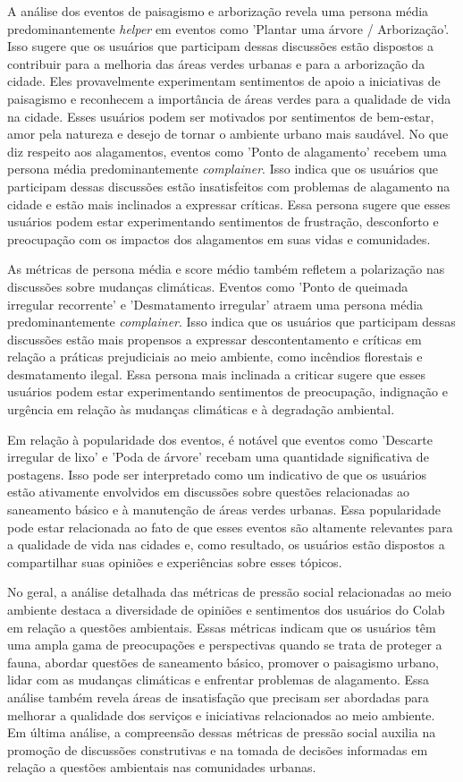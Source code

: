 A análise dos eventos de paisagismo e arborização revela uma persona média predominantemente \textit{helper} em eventos como 'Plantar uma árvore / Arborização'. Isso sugere que os usuários que participam dessas discussões estão dispostos a contribuir para a melhoria das áreas verdes urbanas e para a arborização da cidade. Eles provavelmente experimentam sentimentos de apoio a iniciativas de paisagismo e reconhecem a importância de áreas verdes para a qualidade de vida na cidade. Esses usuários podem ser motivados por sentimentos de bem-estar, amor pela natureza e desejo de tornar o ambiente urbano mais saudável. No que diz respeito aos alagamentos, eventos como 'Ponto de alagamento' recebem uma persona média predominantemente \textit{complainer}. Isso indica que os usuários que participam dessas discussões estão insatisfeitos com problemas de alagamento na cidade e estão mais inclinados a expressar críticas. Essa persona sugere que esses usuários podem estar experimentando sentimentos de frustração, desconforto e preocupação com os impactos dos alagamentos em suas vidas e comunidades.

As métricas de persona média e score médio também refletem a polarização nas discussões sobre mudanças climáticas. Eventos como 'Ponto de queimada irregular recorrente' e 'Desmatamento irregular' atraem uma persona média predominantemente \textit{complainer}. Isso indica que os usuários que participam dessas discussões estão mais propensos a expressar descontentamento e críticas em relação a práticas prejudiciais ao meio ambiente, como incêndios florestais e desmatamento ilegal. Essa persona mais inclinada a criticar sugere que esses usuários podem estar experimentando sentimentos de preocupação, indignação e urgência em relação às mudanças climáticas e à degradação ambiental.

Em relação à popularidade dos eventos, é notável que eventos como 'Descarte irregular de lixo' e 'Poda de árvore' recebam uma quantidade significativa de postagens. Isso pode ser interpretado como um indicativo de que os usuários estão ativamente envolvidos em discussões sobre questões relacionadas ao saneamento básico e à manutenção de áreas verdes urbanas. Essa popularidade pode estar relacionada ao fato de que esses eventos são altamente relevantes para a qualidade de vida nas cidades e, como resultado, os usuários estão dispostos a compartilhar suas opiniões e experiências sobre esses tópicos.

No geral, a análise detalhada das métricas de pressão social relacionadas ao meio ambiente destaca a diversidade de opiniões e sentimentos dos usuários do Colab em relação a questões ambientais. Essas métricas indicam que os usuários têm uma ampla gama de preocupações e perspectivas quando se trata de proteger a fauna, abordar questões de saneamento básico, promover o paisagismo urbano, lidar com as mudanças climáticas e enfrentar problemas de alagamento. Essa análise também revela áreas de insatisfação que precisam ser abordadas para melhorar a qualidade dos serviços e iniciativas relacionados ao meio ambiente. Em última análise, a compreensão dessas métricas de pressão social auxilia na promoção de discussões construtivas e na tomada de decisões informadas em relação a questões ambientais nas comunidades urbanas.

